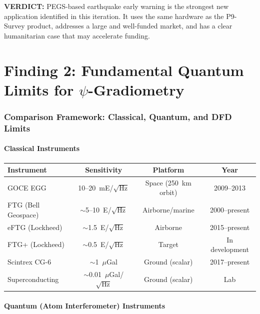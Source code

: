 \documentclass[11pt]{article}
\theoremstyle{definition}
\theoremstyle{remark}
\newcommand{\verdict}[1]{\textcolor{green!50!black}{\textbf{VERDICT:} #1}}
\begin{document}
\verdict{PEGS-based earthquake early warning is the strongest new
application identified in this iteration. It uses the same hardware
as the P9-Survey product, addresses a large and well-funded market,
and has a clear humanitarian case that may accelerate funding.}

\part{Finding 2: Fundamental Quantum Limits for $\psi$-Gradiometry}
\label{part:quantum-limits}

\section{Comparison Framework: Classical, Quantum, and DFD Limits}
\label{sec:comparison}

\subsection{Classical Instruments}

\begin{center}
\begin{tabular}{lccc}
\toprule
\textbf{Instrument} & \textbf{Sensitivity} & \textbf{Platform} & \textbf{Year} \\
\midrule
GOCE EGG & 10--20~mE/$\sqrt{\text{Hz}}$ & Space (250~km orbit) & 2009--2013 \\
FTG (Bell Geospace) & $\sim$5--10~E/$\sqrt{\text{Hz}}$ & Airborne/marine & 2000--present \\
eFTG (Lockheed) & $\sim$1.5~E/$\sqrt{\text{Hz}}$ & Airborne & 2015--present \\
FTG+ (Lockheed) & $\sim$0.5~E/$\sqrt{\text{Hz}}$ & Target & In development \\
Scintrex CG-6 & $\sim$1~$\mu$Gal & Ground (scalar) & 2017--present \\
Superconducting & $\sim$0.01~$\mu$Gal/$\sqrt{\text{Hz}}$ & Ground (scalar) & Lab \\
\bottomrule
\end{tabular}
\end{center}

\subsection{Quantum (Atom Interferometer) Instruments}
\end{document}
